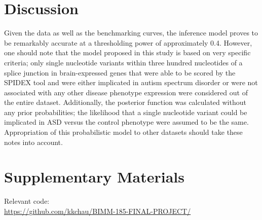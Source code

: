\documentclass[12pt]{article}
\begin{document}
\pagebreak

\section{Discussion}
Given the data as well as the benchmarking curves, the inference model proves
to be remarkably accurate at a thresholding power of approximately 0.4.
However, one should note that the model proposed in
this study is based on very specific criteria; only single nucleotide variants
within three hundred nucleotides of a splice junction in brain-expressed genes
that were able to be scored by the SPIDEX tool and were either implicated in 
autism spectrum disorder or were not associated with any other disease 
phenotype expression were considered out of the 
entire dataset. Additionally, the posterior function was calculated without
any prior probabilities; the likelihood that a single nucleotide variant could
be implicated in ASD versus the control phenotype were assumed to be the same.
Appropriation of this probabilistic model to other datasets should take these
notes into account.

\section{Supplementary Materials}
Relevant code:\\
\href{https://github.com/kkchau/BIMM-185-FINAL-PROJECT/}{https://github.com/kkchau/BIMM-185-FINAL-PROJECT/}
\end{document}
